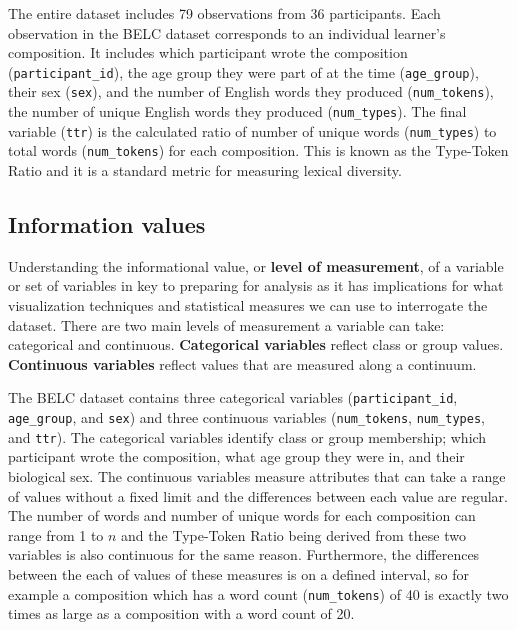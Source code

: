 \documentclass[
  letterpaper,
]{latex/krantz}
\begin{document}
The entire dataset includes 79 observations from 36 participants. Each
observation in the BELC dataset corresponds to an individual learner's
composition. It includes which participant wrote the composition
(\texttt{participant\_id}), the age group they were part of at the time
(\texttt{age\_group}), their sex (\texttt{sex}), and the number of
English words they produced (\texttt{num\_tokens}), the number of unique
English words they produced (\texttt{num\_types}). The final variable
(\texttt{ttr}) is the calculated ratio of number of unique words
(\texttt{num\_types}) to total words (\texttt{num\_tokens}) for each
composition. This is known as the Type-Token Ratio and it is a standard
metric for measuring lexical diversity.

\hypertarget{information-values}{%
\subsection{Information values}\label{information-values}}

Understanding the informational value, or \textbf{level of measurement},
of a variable or set of variables in key to preparing for analysis as it
has implications for what visualization techniques and statistical
measures we can use to interrogate the dataset. There are two main
levels of measurement a variable can take: categorical and continuous.
\textbf{Categorical variables} reflect class or group values.
\textbf{Continuous variables} reflect values that are measured along a
continuum.

The BELC dataset contains three categorical variables
(\texttt{participant\_id}, \texttt{age\_group}, and \texttt{sex}) and
three continuous variables (\texttt{num\_tokens}, \texttt{num\_types},
and \texttt{ttr}). The categorical variables identify class or group
membership; which participant wrote the composition, what age group they
were in, and their biological sex. The continuous variables measure
attributes that can take a range of values without a fixed limit and the
differences between each value are regular. The number of words and
number of unique words for each composition can range from 1 to \(n\)
and the Type-Token Ratio being derived from these two variables is also
continuous for the same reason. Furthermore, the differences between the
each of values of these measures is on a defined interval, so for
example a composition which has a word count (\texttt{num\_tokens}) of
40 is exactly two times as large as a composition with a word count of
20.
\end{document}
